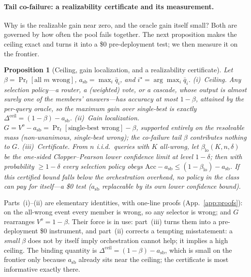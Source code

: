 \documentclass[11pt]{article}
\theoremstyle{plain}
\newtheorem{proposition}{Proposition}
\theoremstyle{definition}
\begin{document}
\paragraph{Tail co-failure: a realizability certificate and its measurement.}\label{sec:realiz}
Why is the realizable gain near zero, and the oracle gain itself small? Both are governed by how often the pool fails
together. The next proposition makes the ceiling exact and turns it into a \$0 pre-deployment test; we then measure it on the
frontier.

\begin{proposition}[Ceiling, gain localization, and a realizability certificate]\label{prop:cert}
Let $\beta=\Pr_t[\text{all } m \text{ wrong}]$, $a_{\mathrm{sb}}=\max_i\bar q_i$, and $i^\star=\arg\max_i\bar q_i$.
\emph{(i)~Ceiling.} Any selection policy---a router, a (weighted) vote, or a cascade, whose output is almost surely one of
the members' answers---has accuracy at most $1-\beta$, attained by the per-query oracle, so the maximum gain over single-best
is exactly $\Delta^{\mathrm{ceil}}=(1-\beta)-a_{\mathrm{sb}}$. \emph{(ii)~Gain localization.} $G=V^o-a_{\mathrm{sb}}=\Pr_t[\text{single-best wrong}]-\beta$,
supported entirely on the \emph{resolvable} mass (non-unanimous, single-best wrong); the co-failure tail $\beta$ contributes
nothing to $G$. \emph{(iii)~Certificate.} From $n$ i.i.d.\ queries with $K$ all-wrong, let $\beta_{\mathrm{lo}}(K,n,\delta)$ be
the one-sided Clopper--Pearson lower confidence limit at level $1-\delta$; then with probability $\ge1-\delta$ every selection policy obeys
$\mathrm{Acc}-a_{\mathrm{sb}}\le(1-\beta_{\mathrm{lo}})-a_{\mathrm{sb}}$. If this certified bound falls below the orchestration
overhead, no policy in the class can pay for itself---a \$0 test ($a_{\mathrm{sb}}$ replaceable by its own \emph{lower} confidence bound).
\end{proposition}
\noindent Parts~(i)--(ii) are elementary identities, with one-line proofs (App.~\ref{app:proofs}): on the all-wrong event every member is wrong, so any selector is wrong;
and $G$ rearranges $V^o=1-\beta$. Their force is in use: part~(iii) turns them into a pre-deployment \$0
instrument, and part~(ii) corrects a tempting misstatement: a \emph{small} $\beta$ does not by itself imply orchestration cannot
help; it implies a high ceiling. The binding quantity is $\Delta^{\mathrm{ceil}}=(1-\beta)-a_{\mathrm{sb}}$, which is small on
the frontier only because $a_{\mathrm{sb}}$ already sits near the ceiling; the certificate is most informative exactly there.
\end{document}
